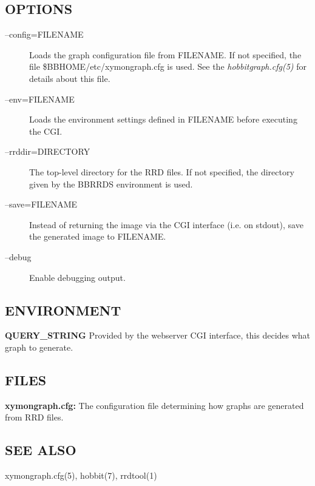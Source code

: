 \subsection{OPTIONS}
\begin{description}
\item[--config=FILENAME] Loads the graph configuration file from FILENAME. If not specified, the file \$BBHOME/etc/xymongraph.cfg is used. See the \emph{hobbitgraph.cfg(5)}
 for details about this file. 

 

\item[--env=FILENAME] Loads the environment settings defined in FILENAME before executing the CGI. 

 

\item[--rrddir=DIRECTORY] The top-level directory for the RRD files. If not specified, the directory given by the BBRRDS environment is used. 

 

\item[--save=FILENAME] Instead of returning the image via the CGI interface (i.e. on stdout), save the generated image to FILENAME. 

 

\item[--debug] Enable debugging output. 

 


\end{description}
\subsection{ENVIRONMENT}


 \textbf{QUERY\_STRING}
 Provided by the webserver CGI interface, this decides what graph to generate. 


 
\subsection{FILES}


 \textbf{xymongraph.cfg:}
 The configuration file determining how graphs are generated from RRD files. 


 
\subsection{SEE ALSO}
xymongraph.cfg(5), hobbit(7), rrdtool(1) 

